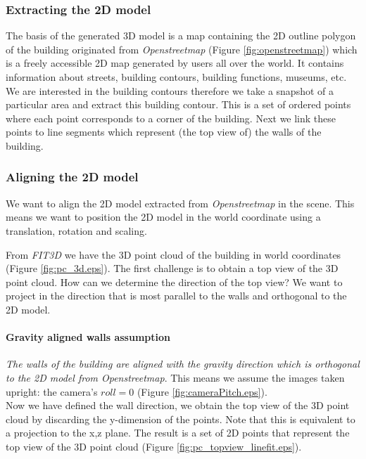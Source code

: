 \subsubsection{Extracting the 2D model}
The basis of the generated 3D model is a map containing the 2D outline polygon
of the building originated from \emph{Openstreetmap\cite{Openstreetmap}} 
(Figure \ref{fig:openstreetmap}) which is a freely accessible 2D map generated by
users all over the world. It contains information about streets, building
contours, building functions, museums, etc.  We are interested in the building
contours therefore we take a snapshot of a particular area and extract this building
contour.  This is a set of ordered points where each point corresponds to a
corner of the building.  Next we link these points to line segments which
represent (the top view of) the walls of the building.

\subsubsection{Aligning the 2D model}
We want to align the 2D model extracted from
\emph{Openstreetmap\cite{Openstreetmap}} in the scene. This means we want to
position the 2D model in the world coordinate using a translation, rotation and
scaling.

From \emph{FIT3D\cite{FIT3D}} we have the 3D point cloud of the building in world coordinates
(Figure \ref{fig:pc_3d.eps}).
The first challenge is to obtain a top view of the 3D point cloud.
How can we determine the direction of the top view? We want to project in the
direction that is most parallel to the walls and orthogonal to the 2D model.

\paragraph{Gravity aligned walls assumption}
	\emph{The walls of the building are aligned with the gravity direction 
	which is orthogonal to the 2D model from \emph{Openstreetmap\cite{Openstreetmap}}}. This means
	we assume the images taken upright: the camera's $roll=0$ (Figure
	\ref{fig:cameraPitch.eps}).\\

Now we have defined the wall direction, we obtain the top view of the 3D point
cloud by discarding the y-dimension of the points.  Note that this is equivalent to a
projection to the x,z plane. The result is a set of 2D points that represent the
top view of the 3D point cloud (Figure \ref{fig:pc_topview_linefit.eps}).

